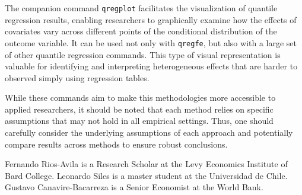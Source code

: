 \documentclass[bib]{statapress}
\begin{document}
The companion command \texttt{qregplot} facilitates the visualization of
quantile regression results, enabling researchers to graphically examine
how the effects of covariates vary across different points of the
conditional distribution of the outcome variable. It can be used not
only with \texttt{qregfe}, but also with a large set of other quantile
regression commands. This type of visual representation is valuable for
identifying and interpreting heterogeneous effects that are harder to
observed simply using regression tables.

While these commands aim to make this methodologies more accessible to
applied researchers, it should be noted that each method relies on
specific assumptions that may not hold in all empirical settings. Thus,
one should carefully consider the underlying assumptions of each
approach and potentially compare results across methods to ensure robust
conclusions.

\clearpage





\begin{aboutauthors}

Fernando Rios-Avila is a Research Scholar at the Levy Economics
Institute of Bard College. Leonardo Siles is a master student at the
Universidad de Chile. Gustavo Canavire-Bacarreza is a Senior Economist
at the World Bank.

\end{aboutauthors}
\end{document}
